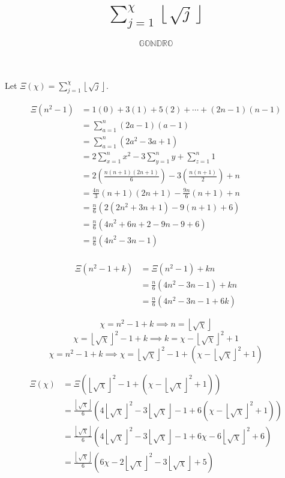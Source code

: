 \documentclass[a4paper]{article}
\title{\(\sum\limits_{j=1}^\chi\left\lfloor\sqrt j\right\rfloor\)}
\author{\(\mathbb{GONDRO}\)}
\begin{document}
\maketitle

Let \(\Xi(\chi)=\sum\limits_{j=1}^\chi\left\lfloor\sqrt j\right\rfloor\).

\[\begin{aligned}
    \Xi\left(n^2-1\right)&=1(0)+3(1)+5(2)+\cdots+(2n-1)(n-1)\\
                       &=\sum\limits_{a=1}^n(2a-1)(a-1)\\
                       &=\sum\limits_{a=1}^n\left(2a^2-3a+1\right)\\
                       &=2\sum\limits_{x=1}^n{x}^2-3\sum\limits_{y=1}^n{y}+\sum\limits_{z=1}^n1\\
                       &=2\left(\frac{n(n+1)(2n+1)}6\right)-3\left(\frac{n(n+1)}2\right)+n\\
                       &=\frac{4n}3(n+1)(2n+1)-\frac{9n}6(n+1)+n\\
                       &=\frac n6\left(2\left(2n^2+3n+1\right)-9(n+1)+6\right)\\
                       &=\frac n6\left(4n^2+6n+2-9n-9+6\right)\\
                       &=\frac n6\left(4n^2-3n-1\right)\\
\end{aligned}\]

\newpage
\[\begin{aligned}
    \Xi\left(n^2-1+k\right)&=\Xi\left(n^2-1\right)+kn\\
                         &=\frac n6\left(4n^2-3n-1\right)+kn\\
                         &=\frac n6\left(4n^2-3n-1+6k\right)
\end{aligned}\]

\[\chi=n^2-1+k\implies n=\left\lfloor\sqrt \chi\right\rfloor\]
\[\chi=\left\lfloor\sqrt \chi\right\rfloor^2-1+k\implies k=\chi-\left\lfloor\sqrt \chi\right\rfloor^2+1\]
\[\chi=n^2-1+k\implies\chi=\left\lfloor\sqrt \chi\right\rfloor^2-1+\left(\chi-\left\lfloor\sqrt \chi\right\rfloor^2+1\right)\]

\[\begin{aligned}
    \Xi(\chi)&=\Xi\left(\left\lfloor\sqrt \chi\right\rfloor^2-1+\left(\chi-\left\lfloor\sqrt \chi\right\rfloor^2+1\right)\right)\\
           &=\frac{\left\lfloor\sqrt \chi\right\rfloor}6\left(4\left\lfloor\sqrt \chi\right\rfloor^2-3\left\lfloor\sqrt \chi\right\rfloor-1+6\left(\chi-\left\lfloor\sqrt \chi\right\rfloor^2+1\right)\right)\\
           &=\frac{\left\lfloor\sqrt \chi\right\rfloor}6\left(4\left\lfloor\sqrt \chi\right\rfloor^2-3\left\lfloor\sqrt \chi\right\rfloor-1+6\chi-6\left\lfloor\sqrt \chi\right\rfloor^2+6\right)\\
           &=\frac{\left\lfloor\sqrt \chi\right\rfloor}6\left(6\chi-2\left\lfloor\sqrt \chi\right\rfloor^2-3\left\lfloor\sqrt \chi\right\rfloor+5\right)\\
\end{aligned}\]
\end{document}

